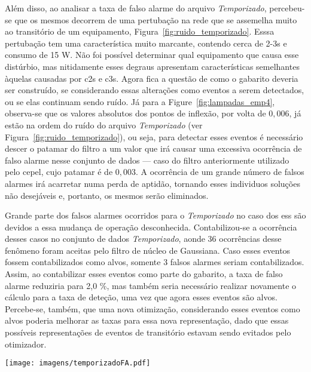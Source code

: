 Além disso, ao analisar a taxa de falso alarme do arquivo
\emph{Temporizado}, percebeu-se que os mesmos decorrem
de uma pertubação na rede que se assemelha muito ao
transitório de um equipamento, Figura~\ref{fig:ruido_temporizado}.
Esssa pertubação tem uma característica muito marcante, contendo cerca
de 2-3s e consumo de 15 W. Não foi possível determinar qual
equipamento que causa esse distúrbio, mas nitidamente esses degraus
apresentam características semelhantes àquelas causadas por \glspl{c2}
e \glspl{c3}. Agora fica a questão de como o gabarito deveria ser
construído, se considerando essas alterações como eventos a serem
detectados, ou se elas continuam sendo ruído. Já para a
Figure~\ref{fig:lampadas_emp4}, 
observa-se que os valores absolutos dos pontos de inflexão,
por volta de $0,006$, já estão na ordem do ruído do arquivo
\emph{Temporizado} (ver Figura~\ref{fig:ruido_temporizado}), ou seja,
para detectar esses eventos é necessário descer o patamar do filtro a
um valor que irá causar uma excessiva ocorrência de falso alarme
nesse conjunto de dados --- caso do filtro anteriormente utilizado pelo
\acs{cepel}, cujo patamar é de $0,003$. A ocorrência de um grande
número de falsos alarmes irá acarretar numa perda de aptidão, tornando
esses individuos soluções não desejáveis e, portanto, os mesmos serão
eliminados.

Grande parte dos falsos alarmes ocorridos para o \emph{Temporizado} no
caso dos \glspl{es} são devidos a essa mudança de operação
desconhecida. Contabilizou-se a ocorrência desses casos no conjunto de
dados \emph{Temporizado}, aonde 36 ocorrências desse fenômeno foram
aceitas pelo filtro de núcleo de Gaussiana. Caso esses eventos fossem
contabilizados como alvos, somente 3 falsos alarmes seriam
contabilizados. Assim, ao contabilizar esses eventos como parte do
gabarito, a taxa de falso alarme reduziria para 2,0 \%, mas também
seria necessário realizar novamente o cálculo para a taxa de deteção,
uma vez que agora esses eventos são alvos. Percebe-se, também, que uma
nova otimização, considerando esses eventos como alvos poderia
melhorar as taxas para essa nova representação, dado que essas
possíveis representações de eventos de transitório estavam sendo
evitados pelo otimizador.

\begin{sidewaysfigure}[p]
\centering
\texttt{[image: imagens/temporizadoFA.pdf]}
\caption[Exemplos de falsos alarmes no conjunto de dados \emph{Temporizado}.]
{Exemplos de falsos alarmes no conjunto de dados \emph{Temporizado}. Os
falsos alarmes são as caixas verdes e vermelhas exibidas. Na subfigura
inferior, são mostrados alguns pontos de inflexão e seus valores em
unidades da resposta do filtro, bem como valores da resposta do filtro
para ruídos.}
\label{fig:ruido_temporizado}
\end{sidewaysfigure}

